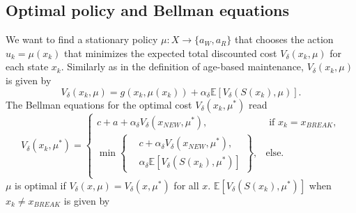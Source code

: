 \documentclass[a4paper]{thesis}
\theoremstyle{definition}
\begin{document}
\subsection{Optimal policy and Bellman equations}
We want to find a stationary policy $\mu:X\rightarrow \{a_W,a_R\}$ that chooses the action $u_k=\mu(x_k)$ that minimizes the expected total discounted cost $V_\delta(x_k,\mu)$ for each state $x_k$.
Similarly as in the definition of age-based maintenance, $V_\delta(x_k,\mu)$ is given by
\[V_\delta(x_k,\mu)=g(x_k,\mu(x_k))+\alpha_\delta \mathbb{E}[V_\delta(S(x_k),\mu)].\]
The Bellman equations for the optimal cost $V_\delta(x_k,\mu^*)$ read
\begin{equation}\label{eq:MmfmBellman}
V_\delta(x_k,\mu^*)=\begin{cases}
c+a+\alpha_\delta V_\delta(x_{NEW},\mu^*),&\text{ if }x_k=x_{BREAK},\\
\min\left\{\begin{split}&c+\alpha_\delta V_\delta(x_{NEW},\mu^*),\\&\alpha_\delta \mathbb{E}[V_\delta(S(x_k),\mu^*)]\end{split}\right\},&\text{else.}\\
\end{cases}
\end{equation}
$\mu$ is optimal if $V_\delta(x,\mu)=V_\delta(x,\mu^*)$ for all $x$.
$\mathbb{E}[V_\delta(S(x_k),\mu^*)]$ when $x_k\neq x_{BREAK}$ is given by 
\end{document}
